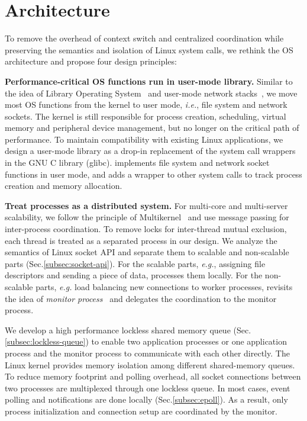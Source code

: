 \section{Architecture}
\label{sec:design}

To remove the overhead of context switch and centralized coordination while preserving the semantics and isolation of Linux system calls, we rethink the OS architecture and propose four design principles:

\textbf{Performance-critical OS functions run in user-mode library.}
Similar to the idea of Library Operating System~ and user-mode network stacks~, we move most OS functions from the kernel to user mode, \textit{i.e.}, file system and network sockets. The kernel is still responsible for process creation, scheduling, virtual memory and peripheral device management, but no longer on the critical path of performance. To maintain compatibility with existing Linux applications, we design a user-mode library \libipc as a drop-in replacement of the system call wrappers in the GNU C library (glibc). \libipc implements file system and network socket functions in user mode, and adds a wrapper to other system calls to track process creation and memory allocation.

\textbf{Treat processes as a distributed system.}
For multi-core and multi-server scalability, we follow the principle of Multikernel~ and use message passing for inter-process coordination. To remove locks for inter-thread mutual exclusion, each thread is treated as a separated process in our design. We analyze the semantics of Linux socket API and separate them to scalable and non-scalable parts (Sec.\ref{subsec:socket-api}). For the scalable parts, \textit{e.g.}, assigning file descriptors and sending a piece of data, \libipc processes them locally. For the non-scalable parts, \textit{e.g.} load balancing new connections to worker processes, \libipc revisits the idea of \textit{monitor process}~ and delegates the coordination to the monitor process.

We develop a high performance lockless shared memory queue (Sec.\ref{subsec:lockless-queue}) to enable two application processes or one application process and the monitor process to communicate with each other directly. The Linux kernel provides memory isolation among different shared-memory queues. To reduce memory footprint and polling overhead, all socket connections between two processes are multiplexed through one lockless queue. In most cases, event polling and notifications are done locally (Sec.\ref{subsec:epoll}). As a result, only process initialization and connection setup are coordinated by the monitor.


